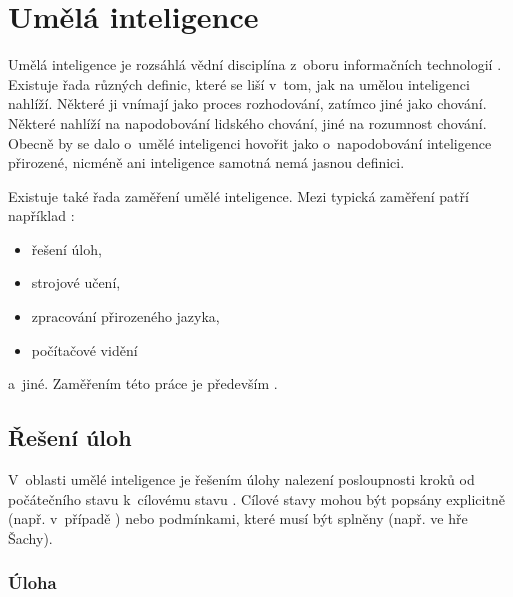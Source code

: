 \chapter{Umělá inteligence}
\label{ch:umela-inteligence}

Umělá inteligence je rozsáhlá vědní disciplína z~oboru informačních technologií \cite{AI_Russel_Norvig}. Existuje řada různých definic, které se liší v~tom, jak na umělou inteligenci nahlíží. Některé ji vnímají jako proces rozhodování, zatímco jiné jako chování. Některé nahlíží na napodobování lidského chování, jiné na rozumnost chování. Obecně by se dalo o~umělé inteligenci hovořit jako o~napodobování inteligence přirozené, nicméně ani inteligence samotná nemá jasnou definici.

Existuje také řada zaměření umělé inteligence. Mezi typická zaměření patří například \cite{AI_Russel_Norvig}:
\begin{itemize}
    \item řešení úloh,
    \item strojové učení,
    \item zpracování přirozeného jazyka,
    \item počítačové vidění
\end{itemize}
a~jiné. Zaměřením této práce je především .


\section{Řešení úloh}
\label{sec:reseni-uloh}

V~oblasti umělé inteligence je řešením úlohy nalezení posloupnosti kroků od počátečního stavu k~cílovému stavu \cite{AI_Russel_Norvig}. Cílové stavy mohou být popsány explicitně (např. v~případě ) nebo podmínkami, které musí být splněny (např.  ve hře Šachy).

\subsection*{Úloha}

